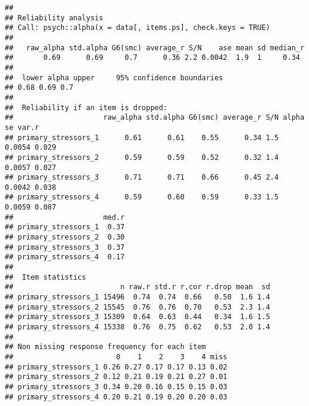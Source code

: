 \documentclass[
]{article}
\begin{document}
\begin{verbatim}
## 
## Reliability analysis   
## Call: psych::alpha(x = data[, items.ps], check.keys = TRUE)
## 
##   raw_alpha std.alpha G6(smc) average_r S/N    ase mean sd median_r
##       0.69      0.69     0.7      0.36 2.2 0.0042  1.9  1     0.34
## 
##  lower alpha upper     95% confidence boundaries
## 0.68 0.69 0.7 
## 
##  Reliability if an item is dropped:
##                     raw_alpha std.alpha G6(smc) average_r S/N alpha se var.r
## primary_stressors_1      0.61      0.61    0.55      0.34 1.5   0.0054 0.029
## primary_stressors_2      0.59      0.59    0.52      0.32 1.4   0.0057 0.027
## primary_stressors_3      0.71      0.71    0.66      0.45 2.4   0.0042 0.038
## primary_stressors_4      0.59      0.60    0.59      0.33 1.5   0.0059 0.087
##                     med.r
## primary_stressors_1  0.37
## primary_stressors_2  0.30
## primary_stressors_3  0.37
## primary_stressors_4  0.17
## 
##  Item statistics 
##                         n raw.r std.r r.cor r.drop mean  sd
## primary_stressors_1 15496  0.74  0.74  0.66   0.50  1.6 1.4
## primary_stressors_2 15545  0.76  0.76  0.70   0.53  2.3 1.4
## primary_stressors_3 15309  0.64  0.63  0.44   0.34  1.6 1.5
## primary_stressors_4 15338  0.76  0.75  0.62   0.53  2.0 1.4
## 
## Non missing response frequency for each item
##                        0    1    2    3    4 miss
## primary_stressors_1 0.26 0.27 0.17 0.17 0.13 0.02
## primary_stressors_2 0.12 0.21 0.19 0.21 0.27 0.01
## primary_stressors_3 0.34 0.20 0.16 0.15 0.15 0.03
## primary_stressors_4 0.20 0.21 0.19 0.20 0.20 0.03
\end{verbatim}
\end{document}
